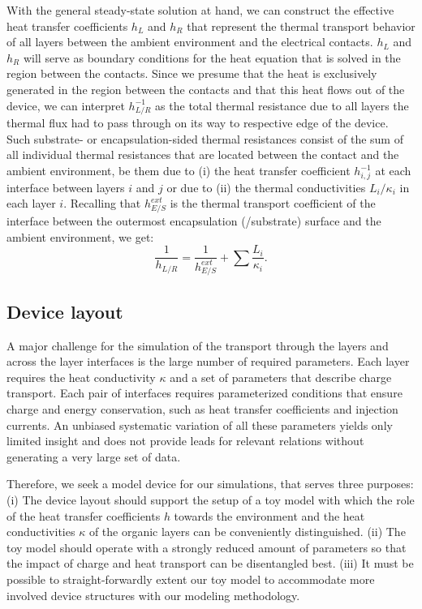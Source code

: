 \documentclass[%
9pt,
 aip,
rsi,%
 amsmath,amssymb,
preprint,%
]{revtex4-1}
\begin{document}
With the general steady-state solution at hand, we can construct the effective heat transfer coefficients $h_{L}$ and $h_{R}$ that represent the thermal transport behavior of all layers between the ambient environment and the electrical contacts. $h_{L}$ and $h_{R}$ will serve as boundary conditions for the heat equation that is solved in the region between the contacts.
Since we presume that the heat is exclusively generated in the region between the contacts and that this heat flows out of the device, we can interpret $h_{L/R}^{-1}$ as the total thermal resistance due to all layers the thermal flux had to pass through on its way to respective edge of the device.
Such substrate- or encapsulation-sided thermal resistances consist of the sum of all individual thermal resistances that are located between the contact and the ambient environment, be them due to (i) the heat transfer coefficient $h_{i,j}^{-1}$ at each interface between layers $i$ and $j$ or due to (ii) the thermal conductivities ${L_i}/{\kappa_i}$ in each layer $i$.  
Recalling that $h_{E/S}^{ext}$ is the thermal transport coefficient of the interface between the outermost encapsulation (/substrate) surface and the ambient environment, we get:
\begin{equation}
\frac{1}{h_{L/R}} = \frac{1}{h_{E/S}^{ext}} + \sum \frac{L_i}{\kappa_i}.
\label{eq:effectiveh}
\end{equation}

\subsection{Device layout}
A major challenge for the simulation of the transport through the layers and across the layer interfaces is the large number of required parameters.
Each layer requires the heat conductivity $\kappa$ and a set of parameters that describe charge transport. 
Each pair of interfaces requires parameterized conditions that ensure charge and energy conservation, such as heat transfer coefficients and injection currents. 
An unbiased systematic variation of all these parameters yields only limited insight and does not provide leads for relevant relations without generating a very large set of data.

Therefore, we seek a model device for our simulations, that serves three purposes: 
(i) The device layout should support the setup of a toy model with which the role of the heat transfer coefficients $h$ towards the environment and the heat conductivities $\kappa$ of the organic layers can be conveniently distinguished.
(ii) The toy model should operate with a strongly reduced amount of parameters so that the impact of charge and heat transport can be disentangled best.
(iii) It must be possible to straight-forwardly extent our toy model to accommodate more involved device structures with our modeling methodology.
\end{document}
